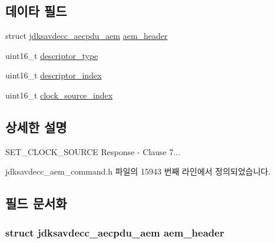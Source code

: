 \subsection*{데이타 필드}
\begin{DoxyCompactItemize}
\item 
struct \hyperlink{structjdksavdecc__aecpdu__aem}{jdksavdecc\+\_\+aecpdu\+\_\+aem} \hyperlink{structjdksavdecc__aem__command__set__clock__source__response_ae1e77ccb75ff5021ad923221eab38294}{aem\+\_\+header}
\item 
uint16\+\_\+t \hyperlink{structjdksavdecc__aem__command__set__clock__source__response_ab7c32b6c7131c13d4ea3b7ee2f09b78d}{descriptor\+\_\+type}
\item 
uint16\+\_\+t \hyperlink{structjdksavdecc__aem__command__set__clock__source__response_a042bbc76d835b82d27c1932431ee38d4}{descriptor\+\_\+index}
\item 
uint16\+\_\+t \hyperlink{structjdksavdecc__aem__command__set__clock__source__response_ae6d3717453951addecc331540f572e30}{clock\+\_\+source\+\_\+index}
\end{DoxyCompactItemize}


\subsection{상세한 설명}
S\+E\+T\+\_\+\+C\+L\+O\+C\+K\+\_\+\+S\+O\+U\+R\+CE Response -\/ Clause 7... 

jdksavdecc\+\_\+aem\+\_\+command.\+h 파일의 15943 번째 라인에서 정의되었습니다.



\subsection{필드 문서화}
\subsubsection[{\texorpdfstring{aem\+\_\+header}{aem_header}}]{\setlength{\rightskip}{0pt plus 5cm}struct {\bf jdksavdecc\+\_\+aecpdu\+\_\+aem} aem\+\_\+header}\hypertarget{structjdksavdecc__aem__command__set__clock__source__response_ae1e77ccb75ff5021ad923221eab38294}{}\label{structjdksavdecc__aem__command__set__clock__source__response_ae1e77ccb75ff5021ad923221eab38294}


